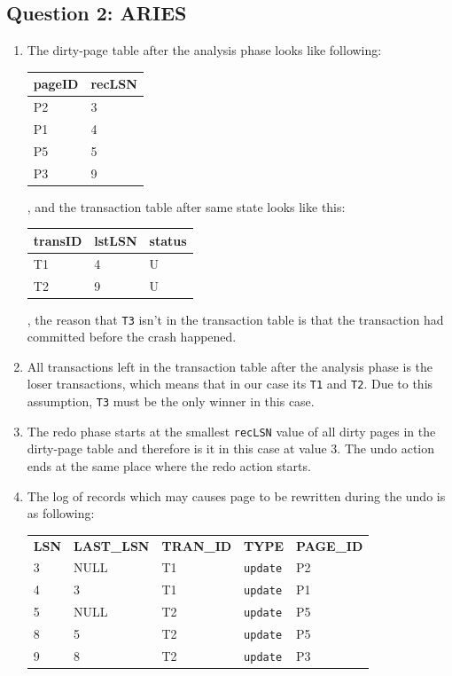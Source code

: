 \documentclass[10pt,a4paper]{article}
\begin{document}
\subsection*{Question 2: ARIES}
\begin{enumerate}
	\item The dirty-page table after the analysis phase looks like following:
		\begin{center}
		\begin{tabular}{|l|l|}
			\hline
			\textbf{pageID} & \textbf{recLSN} \\ \hline
			P2 & 3 \\ \hline
			P1 & 4 \\ \hline
			P5 & 5 \\ \hline
			P3 & 9 \\ \hline
		\end{tabular}
		\end{center}
		, and the transaction table after same state looks like this:
		\begin{center}
		\begin{tabular}{|l|l|l|}
			\hline
			\textbf{transID} & \textbf{lstLSN} & \textbf{status} \\ \hline
			T1 & 4 & U \\ \hline
			T2 & 9 & U \\ \hline
		\end{tabular}
		\end{center}
		, the reason that \texttt{T3} isn't in the transaction table is that the transaction had committed before the crash happened.
	\item All transactions left in the transaction table after the analysis phase is the loser transactions, which means that in our case its \texttt{T1} and \texttt{T2}. Due to this assumption, \texttt{T3} must be the only winner in this case.
	\item The redo phase starts at the smallest \texttt{recLSN} value of all dirty pages in the dirty-page table and therefore is it in this case at value 3. The undo action ends at the same place where the redo action starts. 
	\item The log of records which may causes page to be rewritten during the undo is as following:
	
	\begin{tabular}{l l l l l}
		\textbf{LSN} & \textbf{LAST\_LSN} & \textbf{TRAN\_ID} & \textbf{TYPE} & \textbf{PAGE\_ID} \\
		3 & NULL & T1& \texttt{update} & P2 \\ 			
		4 & 3 & T1 & \texttt{update} & P1 \\
		5 & NULL & T2 & \texttt{update} & P5 \\
		8 & 5 & T2 & \texttt{update} & P5 \\
		9 & 8 & T2 & \texttt{update} & P3 \\
	\end{tabular}
	

\end{enumerate}
\end{document}
